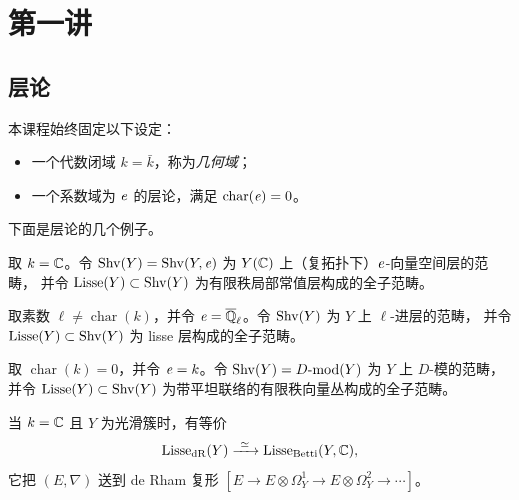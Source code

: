 \section{第一讲}

\subsection{层论}

本课程始终固定以下设定：

\begin{itemize}
\item 一个代数闭域 \(k=\bar k\)，称为\emph{几何域}；
\item 一个系数域为 \(\mathit{e}\) 的层论，满足 \(\operatorname{char}(\mathit{e})=0\)。
\end{itemize}

下面是层论的几个例子。

\begin{example}[Betti 情形]\label{ex:betti}
取 \(k=\mathbb{C}\)。令 \(\operatorname{Shv}(Y)=\operatorname{Shv}(Y,\mathit{e})\) 为 \(Y(\mathbb{C})\) 上（复拓扑下）\(\mathit{e}\)-向量空间层的范畴，
并令 \(\operatorname{Lisse}(Y)\subset\operatorname{Shv}(Y)\) 为有限秩局部常值层构成的全子范畴。
\end{example}

\begin{example}\label{ex:etale}
取素数 \(\ell\neq\operatorname{char}(k)\)，并令 \(\mathit{e}=\overline{\mathbb{Q}}_{\ell}\)。令 \(\operatorname{Shv}(Y)\) 为 \(Y\) 上 \(\ell\)-进层的范畴，
并令 \(\operatorname{Lisse}(Y)\subset\operatorname{Shv}(Y)\) 为 lisse 层构成的全子范畴。
\end{example}

\begin{example}[de Rham 情形]\label{ex:dr}
取 \(\operatorname{char}(k)=0\)，并令 \(\mathit{e}=k\)。令 \(\operatorname{Shv}(Y)=D\text{-}\mathrm{mod}(Y)\) 为 \(Y\) 上 \(D\)-模的范畴，
并令 \(\operatorname{Lisse}(Y)\subset\operatorname{Shv}(Y)\) 为带平坦联络的有限秩向量丛构成的全子范畴。
\end{example}

\begin{remark}\label{rem:rh}
当 \(k=\mathbb{C}\) 且 \(Y\) 为光滑簇时，有等价
\[
\Lisse_{\dR}(Y)\xrightarrow{\ \simeq\ }\Lisse_{\Betti}(Y,\C),
\]
它把 \((E,\nabla)\) 送到 de Rham 复形
\([E\to E\otimes\Omega^1_Y\to E\otimes\Omega^2_Y\to\cdots]\)。
\end{remark}

